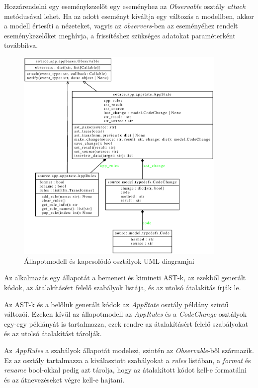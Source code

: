 Hozzárendelni egy eseménykezelőt egy eseményhez az \emph{Observable} osztály
\emph{attach} metódusával lehet.
Ha az adott eseményt kiváltja egy változás a modellben, akkor a modell értesíti a
nézeteket,
vagyis az \emph{observers}-ben az eseményéhez rendelt eseménykezelőket meghívja,
a frissítéshez szükséges adatokat paraméterként továbbítva.

\begin{figure}[H]
	\centering
	\includegraphics[width=0.9\textwidth]{images/uml/appstate.eps}
	\caption{Állapotmodell és kapcsolódó osztályok UML diagramjai}
\end{figure}

Az alkalmazás egy állapotát a bemeneti és kimineti AST-k, az ezekből generált kódok,
az átalakításért felelő szabályok listája, és az utolsó átalakítás írják le.

Az AST-k és a belőlük generált kódok az \emph{AppState} osztály példány szintű változói.
Ezeken kívül az állapotmodell az \emph{AppRules} és a \emph{CodeChange} osztályok egy-egy
példányát
is tartalmazza, ezek rendre az átalakításért felelő szabályokat és az utolsó átalakítást
tárolják.

Az \emph{AppRules} a szabályok állapotát modelezi, szintén az \emph{Observable}-ből
származik.
Ez az osztály tartalmazza a kiválasztott szabályokat a \emph{rules} listában,
a \emph{format} és \emph{rename} bool-okkal pedig azt tárolja, hogy az átalakított
kódot kell-e formatálni és az átnevezéseket végre kell-e hajtani.

